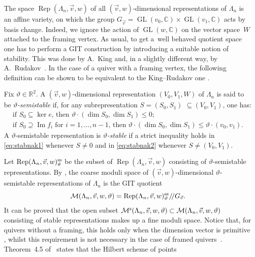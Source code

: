 The space $\operatorname{Rep}(\Lambda_n ,\vec{v},w)$ of all $(\vec{v},w)$-dimensional representations of $\Lambda_n$
is an affine variety, on which the group $G_{\vec{v}}=\operatorname{GL}(v_0,\mathbb{C})\times\operatorname{GL}(v_1,\mathbb{C})$ acts by basis change. Indeed, we ignore the action of $\operatorname{GL}(w,\mathbb{C})$ on the vector space~$W$ attached to the framing vertex. As usual, to get a~well behaved quotient space one has to perform a GIT construction by introducing a suitable notion of stability. This was done by A.~King \cite{KiQ} and, in a slightly different way, by A.~Rudakov~\cite{Rud97}. In the case of a quiver with a framing vertex, the following definition can be shown to be equivalent to the King--Rudakov one \cite{blr, CrBo}.
\begin{Definition}\label{def:stabil}
 Fix $\vartheta\in\mathbb R^2$. A $(\vec{v},w)$-dimensional representation {$(V_0,V_1,W)$} of $\Lambda_n$ is said to be \emph{$\vartheta$-semistable} if, for any subrepresentation $S=(S_0,S_1)$ {$\subseteq (V_0,V_1)$}, one has:
\begin{gather}
 \text{if $S_0\subseteq \ker e$, then $\vartheta\cdot(\dim S_0,\dim S_1)\leq0$} ;\label{eq:stabnak1}\\[5pt]
 \text{if $S_0\supseteq \operatorname{Im} f_i$ for $i=1,\dots,n-1$, then $\vartheta\cdot(\dim S_0,\dim S_1)\leq\vartheta\cdot(v_0,v_1)$} .\label{eq:stabnak2}
\end{gather}
A $\vartheta$-semistable representation is \emph{$\vartheta$-stable} if a strict inequality holds in \eqref{eq:stabnak1} whenever $S\neq0$ and
in \eqref{eq:stabnak2} whenever $S\neq(V_0,V_1)$.
\end{Definition}
Let $\operatorname{Rep}(\Lambda_n, \vec{v}, w)^{\rm ss}_\vartheta$ be the subset of $\operatorname{Rep}(\Lambda_n,\vec{v},w)$ consisting of $\vartheta$-semistable representations. By \cite[Proposition 5.2]{KiQ}, the coarse moduli space of
$(\vec{v},w)$-dimensional $\vartheta$-semistable representations of $\Lambda_n$ is the GIT quotient
\[\mathcal{M} (\Lambda_n,\vec{v},w, \vartheta)=\operatorname{Rep}(\Lambda_n, \vec{v}, w)^{\rm ss}_\vartheta/\!/ G_{\vec{v}} .\]
It can be proved that the open subset $\mathcal{M}^{\rm s} (\Lambda_n,\vec{v},w, \vartheta) \subset \mathcal{M} (\Lambda_n,\vec{v},w, \vartheta)$
consisting of stable representations makes up a fine moduli space. Notice that, for quivers without a framing, this
holds only when the dimension vector is primitive \cite[Proposition~5.3]{KiQ}, whilst this requirement is not necessary in the case of framed quivers~\cite{CrBo}. Theorem~4.5 of~\cite{bblr} states that the Hilbert scheme of points

